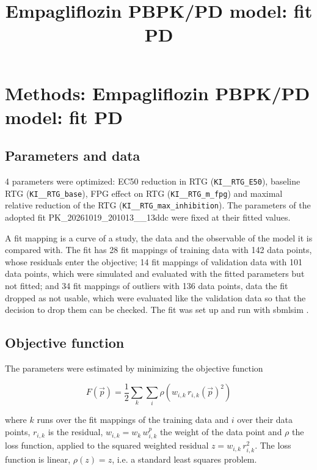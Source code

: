 \documentclass{article}
\title{Empagliflozin PBPK/PD model: fit PD}
\date{}
\begin{document}
\maketitle

\section{Methods: Empagliflozin PBPK/PD model: fit PD}

\subsection{Parameters and data}

4 parameters were optimized: EC50 reduction in RTG (\texttt{KI\_\_RTG\_E50}), baseline RTG (\texttt{KI\_\_RTG\_base}), FPG effect on RTG (\texttt{KI\_\_RTG\_m\_fpg}) and maximal relative reduction of the RTG (\texttt{KI\_\_RTG\_max\_inhibition}). The parameters of the adopted fit PK\_20261019\_201013\_\_13ddc were fixed at their fitted values.

A fit mapping is a curve of a study, the data and the observable of the model it is compared with. The fit has 28 fit mappings of training data with 142 data points, whose residuals enter the objective; 14 fit mappings of validation data with 101 data points, which were simulated and evaluated with the fitted parameters but not fitted; and 34 fit mappings of outliers with 136 data points, data the fit dropped as not usable, which were evaluated like the validation data so that the decision to drop them can be checked. The fit was set up and run with sbmlsim \cite{Koenig2026_sbmlsim}.

\subsection{Objective function}

The parameters were estimated by minimizing the objective function

\begin{equation}
F(\vec{p}) = \frac{1}{2} \sum_{k} \sum_{i} \rho\left(w_{i,k}\, r_{i,k}(\vec{p})^2\right)
\end{equation}

where $k$ runs over the fit mappings of the training data and $i$ over their data points, $r_{i,k}$ is the residual, $w_{i,k} = w_k\, w^{p}_{i,k}$ the weight of the data point and $\rho$ the loss function, applied to the squared weighted residual $z = w_{i,k}\, r_{i,k}^2$. The loss function is linear, $\rho(z) = z$, i.e. a standard least squares problem.
\end{document}
